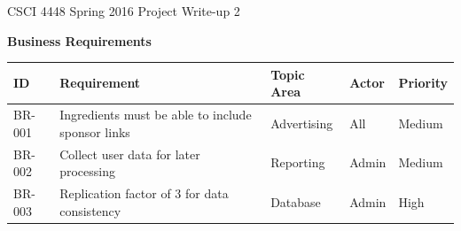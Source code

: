 \documentclass[12pt]{article}
\begin{document}
CSCI 4448 Spring 2016 \hfill Project Write-up 2\\

\hrulefill
\begin{center}
  \textbf{Business Requirements} \\
\begin{tabular}{| l | l | l | l | l | }
  \hline
  \textbf{ID}  & \textbf{Requirement} & \textbf{Topic Area} & \textbf{Actor} & \textbf{Priority} \\ \hline
  BR-001 & Ingredients must be able to include sponsor links & Advertising & All & Medium \\ \hline 
  BR-002 & Collect user data for later processing & Reporting & Admin & Medium \\ \hline
  BR-003 & Replication factor of 3 for data consistency & Database & Admin & High \\ \hline

\end{tabular}
\\
  \vspace{1cm}


\end{center}
\end{document}
